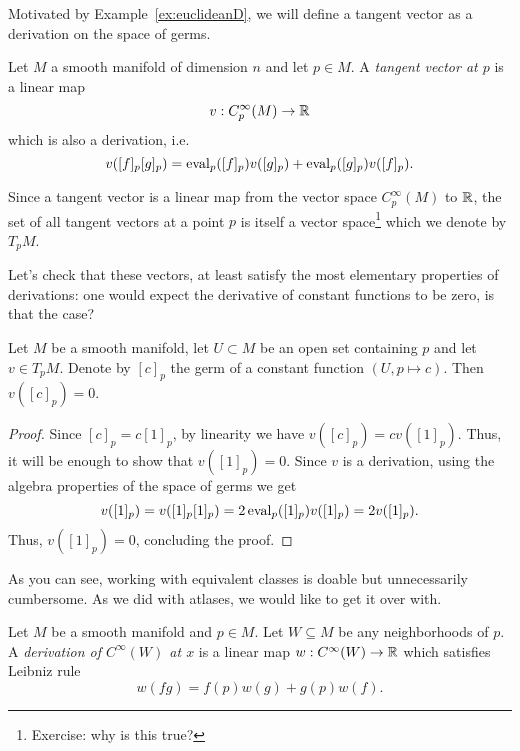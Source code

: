 Motivated by Example~\ref{ex:euclideanD}, we will define a tangent vector as a derivation on the space of germs.

\begin{defn}
    Let $M$ a smooth manifold of dimension $n$ and let $p\in M$.
    A \emph{tangent vector at $p$} is a linear map
    \begin{equation}
        v: C_p^\infty(M)\to\mathbb{R}
    \end{equation}
    which is also a derivation, i.e.
    \begin{equation}
        v([f]_p [g]_p) =
            \operatorname{eval}_p([f]_p)v([g]_p)
            + \operatorname{eval}_p([g]_p)v([f]_p).
    \end{equation}

    Since a tangent vector is a linear map from the vector space $C_p^\infty(M)$ to $\mathbb{R}$, the set of all tangent vectors at a point $p$ is itself a vector space\footnote{Exercise: why is this true?} which we denote by $T_p M$.
\end{defn}

Let's check that these vectors, at least satisfy the most elementary properties of derivations: one would expect the derivative of constant functions to be zero, is that the case?

\begin{lem}\label{lem:f'0is0forconst}
    Let $M$ be a smooth manifold, let $U\subset M$ be an open set containing $p$ and let $v\in T_p M$.
    Denote by $[c]_p$ the germ of a constant function $(U, p \mapsto c)$.
    Then $v([c]_p) = 0$.
\end{lem}
\begin{proof}
    Since $[c]_p = c [1]_p$, by linearity we have $v([c]_p) = c v([1]_p)$.
    Thus, it will be enough to show that $v([1]_p) = 0$.
    Since $v$ is a derivation, using the algebra properties of the space of germs we get
    \begin{equation}
        v([1]_p) = v([1]_p [1]_p) = 2 \operatorname{eval}_p([1]_p)v([1]_p) = 2 v([1]_p).
    \end{equation}
    Thus, $v([1]_p) = 0$, concluding the proof.
\end{proof}

As you can see, working with equivalent classes is doable but unnecessarily cumbersome. As we did with atlases, we would like to get it over with.

\begin{defn}
    Let $M$ be a smooth manifold and $p\in M$.
    Let $W\subseteq M$ be any neighborhoods of $p$.
    A \emph{derivation of $C^\infty(W)$ at $x$} is a linear map $w:C^\infty(W)\to\mathbb{R}$ which satisfies Leibniz rule
    \begin{equation}
        w(fg) = f(p)w(g) + g(p)w(f).
    \end{equation}
\end{defn}

